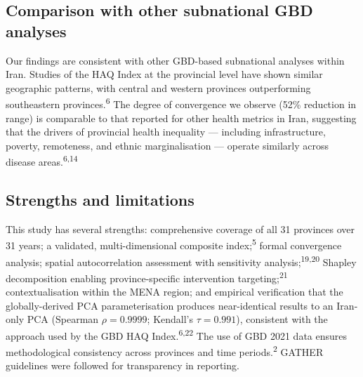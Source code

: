 \documentclass[12pt]{article}
\begin{document}
\subsection{Comparison with other subnational GBD analyses}

Our findings are consistent with other GBD-based subnational analyses within Iran. Studies of the HAQ Index at the provincial level have shown similar geographic patterns, with central and western provinces outperforming southeastern provinces.\textsuperscript{6} The degree of convergence we observe (52\% reduction in range) is comparable to that reported for other health metrics in Iran, suggesting that the drivers of provincial health inequality --- including infrastructure, poverty, remoteness, and ethnic marginalisation --- operate similarly across disease areas.\textsuperscript{6,14}

\subsection{Strengths and limitations}

This study has several strengths: comprehensive coverage of all 31 provinces over 31 years; a validated, multi-dimensional composite index;\textsuperscript{5} formal convergence analysis; spatial autocorrelation assessment with sensitivity analysis;\textsuperscript{19,20} Shapley decomposition enabling province-specific intervention targeting;\textsuperscript{21} contextualisation within the MENA region; and empirical verification that the globally-derived PCA parameterisation produces near-identical results to an Iran-only PCA (Spearman $\rho = 0.9999$; Kendall's $\tau = 0.991$), consistent with the approach used by the GBD HAQ Index.\textsuperscript{6,22} The use of GBD 2021 data ensures methodological consistency across provinces and time periods.\textsuperscript{2} GATHER guidelines were followed for transparency in reporting.
\end{document}
